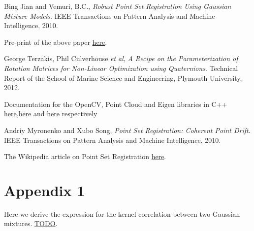 \documentclass[11pt, a4paper]{article}
\begin{document}
\begin{thebibliography}{9}

  Bing Jian and Vemuri, B.C.,
  \emph{Robust Point Set Registration Using Gaussian Mixture Models}.
  IEEE Transactions on Pattern Analysis and Machine Intelligence,
  2010.
  
  Pre-print of the above paper \href{http://code.google.com/p/gmmreg/downloads/detail?name=gmmreg_PAMI_preprint.pdf}{here}.
  
  George Terzakis, Phil Culverhouse \textit{et al},
  \emph{A Recipe on the Parameterization of Rotation Matrices for Non-Linear Optimization using Quaternions}.
  Technical Report of the School of Marine Science and Engineering, Plymouth University,
  2012.
  
  Documentation for the OpenCV, Point Cloud and Eigen libraries in C++ \href{http://docs.opencv.org/}{here},\href{http://pointclouds.org/documentation/}{here} and \href{http://eigen.tuxfamily.org/dox/}{here} respectively

  Andriy Myronenko and Xubo Song,
  \emph{Point Set Registration: Coherent Point Drift}.
  IEEE Transactions on Pattern Analysis and Machine Intelligence,
  2010.

  The Wikipedia article on Point Set Registration \href{http://en.wikipedia.org/wiki/Point_set_registration}{here}.

\end{thebibliography}

\section*{Appendix 1}
Here we derive the expression for the kernel correlation between two Gaussian mixtures. \href{lolwa}{TODO}.
\end{document}
